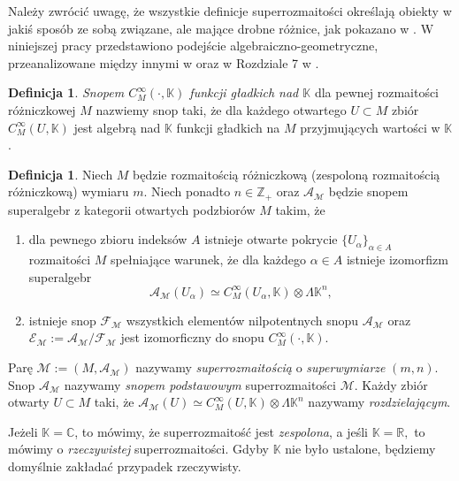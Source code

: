 \documentclass[11pt,a4paper]{report}
\theoremstyle{definition}
\newtheorem{definition}[theorem]{Definicja}
\begin{document}
Należy zwrócić uwagę, że wszystkie definicje superrozmaitości określają obiekty w jakiś sposób ze sobą związane, ale mające drobne różnice, jak pokazano w \cite{bartocci}. W niniejszej pracy przedstawiono podejście algebraiczno-geometryczne, przeanalizowane między innymi w \cite{berezin, varadarajan} oraz w Rozdziale 7 w \cite{rogers}.

\begin{definition}
	\textit{Snopem $C^\infty_M (\cdot, \mathbb{K})$ funkcji gładkich nad $\mathbb{K}$} dla pewnej rozmaitości różniczkowej $M$ nazwiemy snop taki, że dla każdego otwartego $U \subset M$ zbiór $C^\infty_M (U,\mathbb{K})$ jest algebrą nad $\mathbb{K}$ funkcji gładkich na $M$ przyjmujących wartości w $\mathbb{K}$. 
\end{definition}

\begin{definition}
	\label{def:supermanifold}
	Niech $M$ będzie rozmaitością różniczkową (zespoloną rozmaitością różniczkową) wymiaru $m$. Niech ponadto $n \in \mathbb{Z}_+$ oraz $\mathcal{A}_\mathcal{M}$ będzie snopem superalgebr z kategorii otwartych podzbiorów $M$ takim, że
	\begin{enumerate}[(1)]
		\item dla pewnego zbioru indeksów $A$ istnieje otwarte pokrycie $\{ U_\alpha \}_{\alpha \in A}$ rozmaitości $M$ spełniające warunek, że dla każdego $\alpha \in A$ istnieje izomorfizm superalgebr
		      \begin{equation*}
		      	\mathcal{A}_\mathcal{M} (U_\alpha) \simeq C^\infty _M (U_\alpha, \mathbb{K}) \otimes \Lambda \mathbb{K}^n,
		      \end{equation*}
		\item istnieje snop $\mathcal{F}_\mathcal{M}$ wszystkich elementów nilpotentnych snopu $\mathcal{A}_\mathcal{M}$ oraz $\mathcal{E}_\mathcal{M} := \mathcal{A}_\mathcal{M} / \mathcal{F}_\mathcal{M}$ jest izomorficzny do snopu $C^\infty_M ( \cdot, \mathbb{K})$.
	\end{enumerate}
	Parę $\mathcal{M} := (M, \mathcal{A}_\mathcal{M})$ nazywamy \textit{superrozmaitością} o \textit{superwymiarze} $(m,n)$. Snop $\mathcal{A}_\mathcal{M}$ nazywamy \textit{snopem podstawowym} superrozmaitości $\mathcal{M}$. Każdy zbiór otwarty $U \subset M$ taki, że $\mathcal{A}_\mathcal{M} (U) \simeq C^\infty_M (U, \mathbb{K}) \otimes \Lambda \mathbb{K}^n$ nazywamy \textit{rozdzielającym}.
				
	Jeżeli $\mathbb{K}=\mathbb{C}$, to mówimy, że superrozmaitość jest \textit{zespolona}, a jeśli $\mathbb{K}=\mathbb{R},$ to mówimy o \textit{rzeczywistej} superrozmaitości. Gdyby $\mathbb{K}$ nie było ustalone, będziemy domyślnie zakładać przypadek rzeczywisty.
\end{definition}
\end{document}
